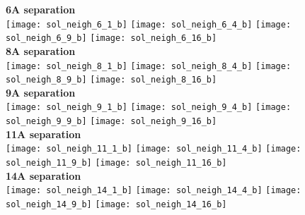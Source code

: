 \documentclass[journal=acsnano,manuscript=article]{achemso}
\begin{document}
\begin{figure}[h!]
	\centering
	\textbf{6A separation} \\
	\texttt{[image: sol\_neigh\_6\_1\_b]}
	\texttt{[image: sol\_neigh\_6\_4\_b]}
	\texttt{[image: sol\_neigh\_6\_9\_b]}
	\texttt{[image: sol\_neigh\_6\_16\_b]}
	\\ \textbf{8A separation} \\
	\texttt{[image: sol\_neigh\_8\_1\_b]}
	\texttt{[image: sol\_neigh\_8\_4\_b]}
	\texttt{[image: sol\_neigh\_8\_9\_b]}
	\texttt{[image: sol\_neigh\_8\_16\_b]}
	\\ \textbf{9A separation} \\
	\texttt{[image: sol\_neigh\_9\_1\_b]}
	\texttt{[image: sol\_neigh\_9\_4\_b]}
	\texttt{[image: sol\_neigh\_9\_9\_b]}
	\texttt{[image: sol\_neigh\_9\_16\_b]}
	\\ \textbf{11A separation} \\
	\texttt{[image: sol\_neigh\_11\_1\_b]}
	\texttt{[image: sol\_neigh\_11\_4\_b]}
	\texttt{[image: sol\_neigh\_11\_9\_b]}
	\texttt{[image: sol\_neigh\_11\_16\_b]}
	\\ \textbf{14A separation} \\
	\texttt{[image: sol\_neigh\_14\_1\_b]}
	\texttt{[image: sol\_neigh\_14\_4\_b]}
	\texttt{[image: sol\_neigh\_14\_9\_b]}
	\texttt{[image: sol\_neigh\_14\_16\_b]}
	\label{fig:neigh_sol}
\end{figure}
\end{document}
